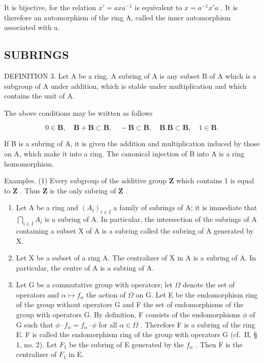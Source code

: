 It is bijective, for the relation \(x' = axa^{-1}\) is equivalent to \(x = a^{-1}x'a\) . It is therefore an automorphism of the ring A, called the inner automorphism associated with a.

\subsection{SUBRINGS}

DEFINITION 3. Let A be a ring. A subring of A is any subset B of A which is a subgroup of A under addition, which is stable under multiplication and which contains the unit of A.

The above conditions may be written as follows

\[
0 \in \mathbf {B}, \quad \mathbf {B} + \mathbf {B} \subset \mathbf {B}, \quad - \mathbf {B} \subset \mathbf {B}, \quad \mathbf {B}. \mathbf {B} \subset \mathbf {B}, \quad 1 \in \mathbf {B}.
\]

If B is a subring of A, it is given the addition and multiplication induced by those on A, which make it into a ring. The canonical injection of B into A is a ring homomorphism.

Examples. (1) Every subgroup of the additive group \(\mathbf{Z}\) which contains 1 is equal to \(\mathbf{Z}\) . Thus \(\mathbf{Z}\) is the only subring of \(\mathbf{Z}\) .

\begin{enumerate}
\def\labelenumi{(\arabic{enumi})}
\setcounter{enumi}{1}
\item
  Let A be a ring and \((A_{t})_{t\in I}\) a family of subrings of A; it is immediate that \(\bigcap_{i\in I}A_{i}\) is a subring of A. In particular, the intersection of the subrings of A containing a subset X of A is a subring called the subring of A generated by X.
\item
  Let X be a subset of a ring A. The centralizer of X in A is a subring of A. In particular, the centre of A is a subring of A.
\item
  Let G be a commutative group with operators; let \(\Omega\) denote the set of operators and \(\alpha \mapsto f_{\alpha}\) the action of \(\Omega\) on G. Let E be the endomorphism ring of the group without operators G and F the set of endomorphisms of the group with operators G. By definition, F consists of the endomorphisms \(\phi\) of G such that \(\phi \cdot f_{\alpha} = f_{\alpha} \cdot \phi\) for all \(\alpha \in \Omega\) . Therefore F is a subring of the ring E. F is called the endomorphism ring of the group with operators G (cf.~II, § 1, no. 2). Let \(F_{1}\) be the subring of E generated by the \(f_{\alpha}\) . Then F is the centralizer of \(F_{1}\) in E.
\end{enumerate}

